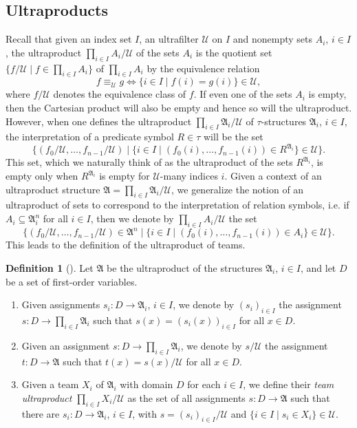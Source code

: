 \documentclass[a4paper]{amsart}
\theoremstyle{definition}
\newtheorem{definition}{Definition}[section]
\theoremstyle{remark}
\newcommand{\A}{\mathcal{A}}
\newcommand{\U}{\mathcal{U}}
\theoremstyle{definition}
\renewcommand{\A}{\mathfrak{A}}
\begin{document}
\subsection{Ultraproducts}

Recall that given an index set $I$, an ultrafilter $\U$ on $I$ and nonempty sets $A_i$, $i\in I$, the ultraproduct $\prod_{i\in I}A_i/\U$ of the sets $A_i$ is the quotient set $\{ f/\U \mid f\in\prod_{i\in I}A_i \}$ of $\prod_{i\in I}A_i$ by the equivalence relation
\[
    f\equiv_\U g \iff \{ i\in I \mid f(i) = g(i) \} \in \U,
\]
where $f/\U$ denotes the equivalence class of $f$. If even one of the sets $A_i$ is empty, then the Cartesian product will also be empty and hence so will the ultraproduct. However, when one defines the ultraproduct $\prod_{i\in I}\A_i/\U$ of $\tau$-structures $\A_i$, $i\in I$, the interpretation of a predicate symbol $R\in\tau$ will be the set
\[
    \{(f_0/\U,\dots,f_{n-1}/\U) \mid \{i\in I \mid (f_0(i),\dots,f_{n-1}(i))\in R^{\A_i}\}\in\U\}.
\]
This set, which we naturally think of as the ultraproduct of the sets $R^{\A_i}$, is empty only when $R^{\A_i}$ is empty for $\U$-many indices $i$. Given a context of an ultraproduct structure $\A = \prod_{i\in I}\A_i/\U$, we generalize the notion of an ultraproduct of sets to correspond to the interpretation of relation symbols, i.e. if $A_i\subseteq\A_i^n$ for all $i\in I$, then we denote by $\prod_{i\in I}A_i/\U$ the set
\[
    \{ (f_0/\U,\dots,f_{n-1}/\U) \in \A^n \mid \{i\in I \mid (f_0(i),\dots,f_{n-1}(i))\in A_i\}\in\U \}.
\]
This leads to the definition of the ultraproduct of teams.

\begin{definition}[\textcite{luck2020team}]
    Let $\A$ be the ultraproduct of the structures $\A_i$, $i\in I$, and let $D$ be a set of first-order variables.
    \begin{enumerate}
        \item Given assignments $s_i\colon D\to\A_i$, $i\in I$, we denote by $(s_i)_{i\in I}$ the assignment $s\colon D\to\prod_{i\in I}\A_i$ such that $s(x) = (s_i(x))_{i\in I}$ for all $x\in D$.
        \item Given an assignment $s\colon D\to\prod_{i\in I}\A_i$, we denote by $s/\U$ the assignment $t\colon D\to\A$ such that $t(x)=s(x)/\U$ for all $x\in D$.
        \item Given a team $X_i$ of $\A_i$ with domain $D$ for each $i\in I$, we define their \emph{team ultraproduct} $\prod_{i\in I}X_i/\U$ as the set of all assignments $s\colon D\to\A$ such that there are $s_i\colon D\to\A_i$, $i\in I$, with $s = (s_i)_{i\in I}/\U$ and $\{i\in I \mid s_i\in X_i\}\in\U$.
    \end{enumerate}
\end{definition}
\end{document}

